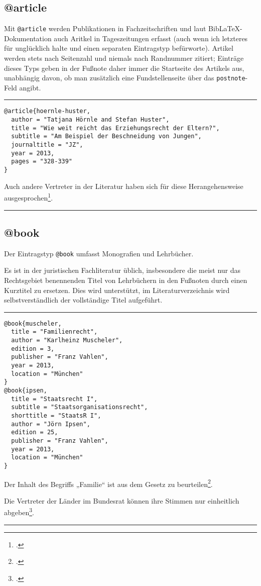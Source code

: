 \documentclass[11pt,a4paper,DIV=calc]{scrartcl}
\newcommand\software[1]{\textsf{#1}}
\newcommand\Biblatex{\software{Bib\LaTeX{}}\xspace}
\newenvironment{rubexample}{\par\vspace{\baselineskip}\hrule\par\begin{refsection}}{\end{refsection}\par\hrule\par\vspace{\baselineskip}}
\begin{document}
\subsection{@article}

Mit \verb+@article+ werden Publikationen in Fachzeitschriften und laut
\Biblatex-Do\-ku\-men\-ta\-tion auch Aritkel in Tageszeitungen erfasst (auch
wenn ich letzteres für unglücklich halte und einen separaten
Eintragstyp befürworte). Artikel werden stets nach Seitenzahl und
niemals nach Randnummer zitiert; Einträge dieses Typs geben in der
Fußnote daher immer die Startseite des Artikels aus, unabhängig davon,
ob man zusätzlich eine Fundstellenseite über das \verb+postnote+-Feld
angibt.

\begin{rubexample}
\begin{verbatim}
@article{hoernle-huster,
  author = "Tatjana Hörnle and Stefan Huster",
  title = "Wie weit reicht das Erziehungsrecht der Eltern?",
  subtitle = "Am Beispiel der Beschneidung von Jungen",
  journaltitle = "JZ",
  year = 2013,
  pages = "328-339"
}
\end{verbatim}

Auch andere Vertreter in der Literatur haben sich für diese
Herangehensweise ausgesprochen\footcite[330]{hoernle-huster}.

\printbibliography
\end{rubexample}

\subsection{@book}

Der Eintragstyp \verb+@book+ umfasst Monografien und Lehrbücher.

Es ist in der juristischen Fachliteratur üblich, insbesondere die
meist nur das Rechtsgebiet benennenden Titel von Lehrbüchern in den
Fußnoten durch einen Kurztitel zu ersetzen. Dies wird unterstützt, im
Literaturverzeichnis wird selbstverständlich der vollständige Titel
aufgeführt.

\begin{rubexample}

\begin{verbatim}
@book{muscheler,
  title = "Familienrecht",
  author = "Karlheinz Muscheler",
  edition = 3,
  publisher = "Franz Vahlen",
  year = 2013,
  location = "München"
}
@book{ipsen,
  title = "Staatsrecht I",
  subtitle = "Staatsorganisationsrecht",
  shorttitle = "StaatsR I",
  author = "Jörn Ipsen",
  edition = 25,
  publisher = "Franz Vahlen",
  year = 2013,
  location = "München"
}
\end{verbatim}

Der Inhalt des Begriffs „Familie“ ist aus dem Gesetz zu
beurteilen\footcite[\S\,1 Rnr. 3]{muscheler}.

Die Vertreter der Länder im Bundesrat können ihre Stimmen nur
einheitlich abgeben\footcite[\S\,7 Rnr. 343ff]{ipsen}.

\printbibliography
\end{rubexample}
\end{document}
